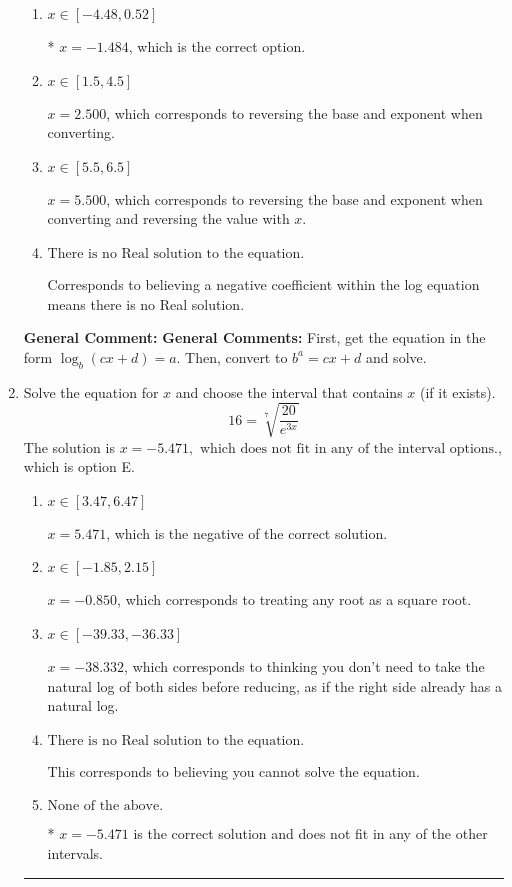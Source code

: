 \documentclass{extbook}[14pt]
\newcommand{\litem}[1]{\item #1

\rule{\textwidth}{0.4pt}}
\begin{document}
\begin{enumerate}
{\begin{enumerate}[label=\Alph*.]
$x = 14.500$, which corresponds to ignoring the vertical shift when converting to exponential form.
\item \( x \in [-4.48, 0.52] \)

* $x = -1.484$, which is the correct option.
\item \( x \in [1.5, 4.5] \)

$x = 2.500$, which corresponds to reversing the base and exponent when converting.
\item \( x \in [5.5, 6.5] \)

$x = 5.500$, which corresponds to reversing the base and exponent when converting and reversing the value with $x$.
\item \( \text{There is no Real solution to the equation.} \)

Corresponds to believing a negative coefficient within the log equation means there is no Real solution.
\end{enumerate}

\textbf{General Comment:} \textbf{General Comments:} First, get the equation in the form $\log_b{(cx+d)} = a$. Then, convert to $b^a = cx+d$ and solve.
}
\litem{
 Solve the equation for $x$ and choose the interval that contains $x$ (if it exists).
\[  16 = \sqrt[7]{\frac{20}{e^{3x}}} \]The solution is \( x = -5.471, \text{ which does not fit in any of the interval options.} \), which is option E.\begin{enumerate}[label=\Alph*.]
\item \( x \in [3.47, 6.47] \)

$x = 5.471$, which is the negative of the correct solution.
\item \( x \in [-1.85, 2.15] \)

$x = -0.850$, which corresponds to treating any root as a square root.
\item \( x \in [-39.33, -36.33] \)

$x = -38.332$, which corresponds to thinking you don't need to take the natural log of both sides before reducing, as if the right side already has a natural log.
\item \( \text{There is no Real solution to the equation.} \)

This corresponds to believing you cannot solve the equation.
\item \( \text{None of the above.} \)

* $x = -5.471$ is the correct solution and does not fit in any of the other intervals.
\end{enumerate}

}
\end{enumerate}
\end{document}
